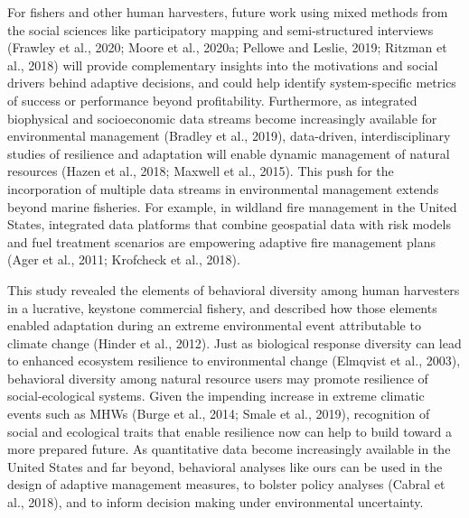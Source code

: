 \documentclass[]{elsarticle} %
\begin{document}
For fishers and other human harvesters, future work using mixed methods
from the social sciences like participatory mapping and semi-structured
interviews (Frawley et al., 2020; Moore et al., 2020a; Pellowe and
Leslie, 2019; Ritzman et al., 2018) will provide complementary insights
into the motivations and social drivers behind adaptive decisions, and
could help identify system-specific metrics of success or performance
beyond profitability. Furthermore, as integrated biophysical and
socioeconomic data streams become increasingly available for
environmental management (Bradley et al., 2019), data-driven,
interdisciplinary studies of resilience and adaptation will enable
dynamic management of natural resources (Hazen et al., 2018; Maxwell et
al., 2015). This push for the incorporation of multiple data streams in
environmental management extends beyond marine fisheries. For example,
in wildland fire management in the United States, integrated data
platforms that combine geospatial data with risk models and fuel
treatment scenarios are empowering adaptive fire management plans (Ager
et al., 2011; Krofcheck et al., 2018).

This study revealed the elements of behavioral diversity among human
harvesters in a lucrative, keystone commercial fishery, and described
how those elements enabled adaptation during an extreme environmental
event attributable to climate change (Hinder et al., 2012). Just as
biological response diversity can lead to enhanced ecosystem resilience
to environmental change (Elmqvist et al., 2003), behavioral diversity
among natural resource users may promote resilience of social-ecological
systems. Given the impending increase in extreme climatic events such as
MHWs (Burge et al., 2014; Smale et al., 2019), recognition of social and
ecological traits that enable resilience now can help to build toward a
more prepared future. As quantitative data become increasingly available
in the United States and far beyond, behavioral analyses like ours can
be used in the design of adaptive management measures, to bolster policy
analyses (Cabral et al., 2018), and to inform decision making under
environmental uncertainty.
\end{document}
